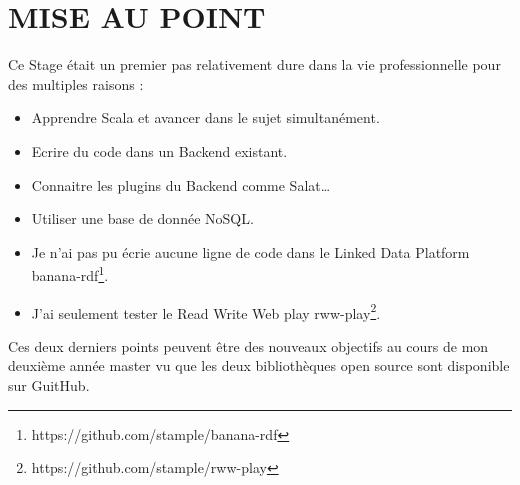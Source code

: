 \chapter{MISE AU POINT}

Ce Stage était un premier pas relativement dure dans la vie professionnelle pour des multiples raisons :
\begin{itemize}
\item Apprendre Scala et avancer dans le sujet simultanément.

\item Ecrire du code dans un Backend existant.

\item Connaitre les plugins du Backend comme Salat…

\item Utiliser une base de donnée NoSQL.

\item Je n'ai pas pu écrie aucune ligne de code dans le Linked Data Platform banana-rdf\footnote{https://github.com/stample/banana-rdf}.

\item J'ai seulement tester le Read Write Web play rww-play\footnote{https://github.com/stample/rww-play}.


\end{itemize}

Ces deux derniers points peuvent être des nouveaux objectifs au cours de mon deuxième année master vu que les deux bibliothèques open source sont disponible sur GuitHub.  
